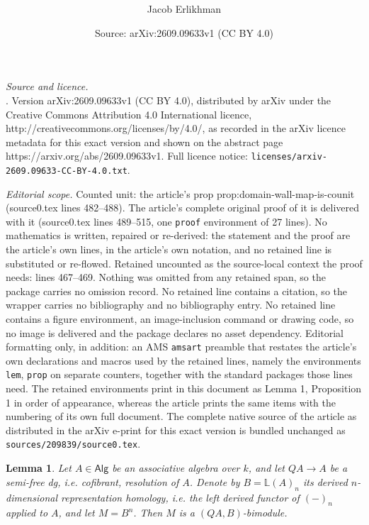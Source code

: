 \documentclass[10pt,a4paper]{amsart}
\title{\vspace{-50pt} \Huge \text{Representation Varieties of Stacks}\\ \text{and Trace Maps}}
\author{Jacob Erlikhman}
\date{Source: arXiv:2609.09633v1 (CC BY 4.0)}
\newtheorem{lem}{Lemma}
\begin{document}
\maketitle

\noindent\emph{Source and licence.} \vspace{-50pt} \Huge {}\\ . Version arXiv:2609.09633v1 (CC BY 4.0), distributed by arXiv under the Creative Commons Attribution 4.0 International licence, http://creativecommons.org/licenses/by/4.0/, as recorded in the arXiv licence metadata for this exact version and shown on the abstract page https://arxiv.org/abs/2609.09633v1. Full licence notice: \texttt{licenses/arxiv-2609.09633-CC-BY-4.0.txt}.\par\smallskip

\noindent\textit{Editorial scope.} Counted unit: the article's prop prop:domain-wall-map-is-counit (source0.tex lines 482--488). The article's complete original proof of it is delivered with it (source0.tex lines 489--515, one \texttt{proof} environment of 27 lines). No mathematics is written, repaired or re-derived: the statement and the proof are the article's own lines, in the article's own notation, and no retained line is substituted or re-flowed.  Retained uncounted as the source-local context the proof needs: lines 467--469.  Nothing was omitted from any retained span, so the package carries no omission record.  No retained line contains a citation, so the wrapper carries no bibliography and no bibliography entry.  No retained line contains a figure environment, an image-inclusion command or drawing code, so no image is delivered and the package declares no asset dependency.  Editorial formatting only, in addition: an AMS \texttt{amsart} preamble that restates the article's own declarations and macros used by the retained lines, namely the environments \texttt{lem}, \texttt{prop} on separate counters, together with the standard packages those lines need.  The retained environments print in this document as Lemma 1, Proposition 1 in order of appearance, whereas the article prints the same items with the numbering of its own full document.  The complete native source of the article as distributed in the arXiv e-print for this exact version is bundled unchanged as \texttt{sources/209839/source0.tex}.
\begin{lem}\label{lem:A-module-structure}
	Let $A\in \mathsf{Alg}$ be an associative algebra over $k$, and let $QA\to A$ be a semi-free dg, i.e. cofibrant, resolution of $A$. Denote by $B=\mathbb{L}(A)_n$ its derived $n$-dimensional representation homology, i.e. the left derived functor of $(-)_n$ applied to $A$, and let $M=B^n$. Then $M$ is a $(QA,B )$-bimodule.
\end{lem} 
\end{document}
